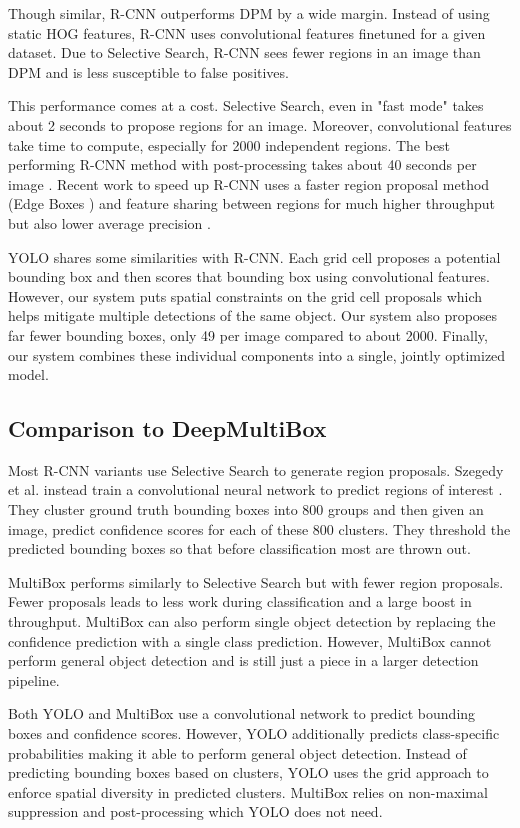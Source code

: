 \documentclass{article} %
\begin{document}
Though similar, R-CNN outperforms DPM by a wide margin. Instead of using static HOG features, R-CNN uses convolutional features finetuned for a given dataset. Due to Selective Search, R-CNN sees fewer regions in an image than DPM and is less susceptible to false positives.

This performance comes at a cost. Selective Search, even in "fast mode" takes about 2 seconds to propose regions for an image. Moreover, convolutional features take time to compute, especially for 2000 independent regions. The best performing R-CNN method with post-processing takes about 40 seconds per image \cite{DBLP:journals/corr/ZhuUSF15}. Recent work to speed up R-CNN uses a faster region proposal method (Edge Boxes \cite{zitnick2014edge}) and feature sharing between regions for much higher throughput but also lower average precision \cite{he2014spatial}.

YOLO shares some similarities with R-CNN. Each grid cell proposes a potential bounding box and then scores that bounding box using convolutional features. However, our system puts spatial constraints on the grid cell proposals which helps mitigate multiple detections of the same object. Our system also proposes far fewer bounding boxes, only 49 per image compared to about 2000. Finally, our system combines these individual components into a single, jointly optimized model.

\subsection{Comparison to DeepMultiBox}

Most R-CNN variants use Selective Search to generate region proposals. Szegedy et al. instead train a convolutional neural network to predict regions of interest \cite{erhan2014scalable}. They cluster ground truth bounding boxes into 800 groups and then given an image, predict confidence scores for each of these 800 clusters. They threshold the predicted bounding boxes so that before classification most are thrown out.

MultiBox performs similarly to Selective Search but with fewer region proposals. Fewer proposals leads to less work during classification and a large boost in throughput. MultiBox can also perform single object detection by replacing the confidence prediction with a single class prediction. However, MultiBox cannot perform general object detection and is still just a piece in a larger detection pipeline.

Both YOLO and MultiBox use a convolutional network to predict bounding boxes and confidence scores. However, YOLO additionally predicts class-specific probabilities making it able to perform general object detection. Instead of predicting bounding boxes based on clusters, YOLO uses the grid approach to enforce spatial diversity in predicted clusters. MultiBox relies on non-maximal suppression and post-processing which YOLO does not need.
\end{document}
